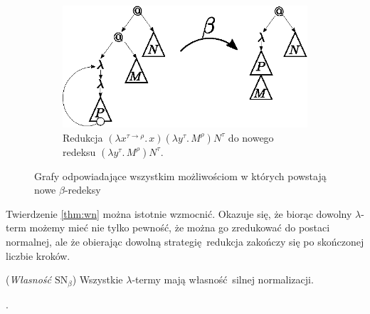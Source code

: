 \begin{dowod}
\begin{figure}[htb]
\end{figure}
\begin{figure}[htb]\ContinuedFloat
  \centering
  \begin{subfigure}{0.55\textwidth}
    \includegraphics[width=1\linewidth]{../reduction3}
    \caption{Redukcja \((\lambda x^{\tau\to\rho}.\,x)(\lambda y^\tau.\,M^\rho) N^\tau\) do nowego redeksu \((\lambda y^\tau.\,M^\rho)N^\tau\).}
  \end{subfigure}
  \caption{Grafy odpowiadające wszystkim możliwościom w których powstają nowe \(\beta\)-redeksy}
\end{figure}
\clearpage

\end{dowod}

Twierdzenie \ref{thm:wn} można istotnie wzmocnić. Okazuje się, że biorąc dowolny \(\lambda\)-term możemy mieć nie tylko pewność, że można go zredukować do postaci normalnej, ale że obierając dowolną strategię redukcja zakończy się po skończonej liczbie kroków.

\begin{twierdzenie}\label{thm:sn}
  (\emph{Własność \(\mathrm{SN}_{\beta}\)}) Wszystkie \(\lambda\)-termy mają własność silnej normalizacji.
  \begin{dowod}
  \cite[tw. 3.5.5]{Urzyczyn2006}.
  \end{dowod}
\end{twierdzenie}


